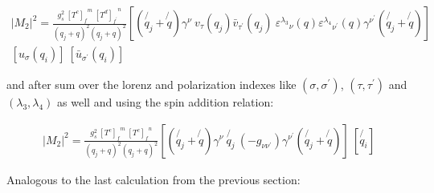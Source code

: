 \begin{equation}
\begin{split}
|M_2|^2 =\frac{g_s^2 \: {[T^c]_f}^m \: {[T^d]_{f^{\prime}}}^n }{(q_j + q)^2 (q_j + q)^2} [(\not{q_j} + \not{q}) \gamma^{\nu}  \:{v}_{\tau}(q_j)\bar{v}_{{\tau}^{\prime}}(q_j)\: {\varepsilon^{\lambda_3}}_{\nu} (q){\varepsilon^{\lambda_4}}_{{\nu}^{\prime}}  (q) \gamma^{{\nu}^{\prime}}(\not{q_j} + \not{q})]\: \\
[{u}_{\sigma}(q_i) ]
\: [\bar{u}_{{\sigma}^{\prime}}(q_i)]
\end{split}
\end{equation}

and after sum over the lorenz and polarization indexes like $({\sigma},{\sigma}^{\prime})$, $({\tau},{\tau}^{\prime})$ and $({\lambda_{3}},{\lambda}_{4})$ as well and using the spin addition relation:
 
%

\begin{equation}
\begin{split}
|M_2|^2 =\frac{g_s^2 \: {[T^c]_f}^m \: {[T^c]_{f}}^n }{(q_j + q)^2 (q_j + q)^2} [(\not{q_j} + \not{q}) \gamma^{\nu}  \:\not{q_j}\: (-g_{{\nu}{{\nu}^{\prime}}}) \gamma^{{\nu}^{\prime}}(\not{q_j} + \not{q})]\: 
[\not{q_i} ]
\end{split}
\end{equation}

Analogous to the last calculation from the previous section:

